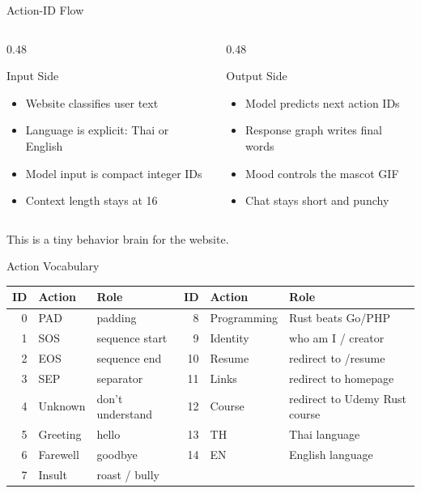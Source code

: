\documentclass[10pt,aspectratio=169]{beamer}
\begin{document}
\begin{frame}{Action-ID Flow}
  \begin{columns}[T]
    \begin{column}{0.48\textwidth}
      \begin{block}{Input Side}
        \begin{itemize}
          \item Website classifies user text
          \item Language is explicit: Thai or English
          \item Model input is compact integer IDs
          \item Context length stays at 16
        \end{itemize}
      \end{block}
    \end{column}
    \begin{column}{0.48\textwidth}
      \begin{block}{Output Side}
        \begin{itemize}
          \item Model predicts next action IDs
          \item Response graph writes final words
          \item Mood controls the mascot GIF
          \item Chat stays short and punchy
        \end{itemize}
      \end{block}
    \end{column}
  \end{columns}

  \bigskip
  \centering
  This is a tiny behavior brain for the website.
\end{frame}

\begin{frame}{Action Vocabulary}
  \small
  \centering
  \begin{tabular}{rll@{\qquad}rll}
    \toprule
    \textbf{ID} & \textbf{Action} & \textbf{Role}
      & \textbf{ID} & \textbf{Action} & \textbf{Role} \\
    \midrule
     0 & PAD & padding            &  8 & Programming & Rust beats Go/PHP \\
     1 & SOS & sequence start     &  9 & Identity & who am I / creator \\
     2 & EOS & sequence end       & 10 & Resume & redirect to /resume \\
     3 & SEP & separator          & 11 & Links & redirect to homepage \\
     4 & Unknown & don't understand & 12 & Course & redirect to Udemy Rust course \\
     5 & Greeting & hello          & 13 & TH & Thai language \\
     6 & Farewell & goodbye        & 14 & EN & English language \\
     7 & Insult & roast / bully    &    &    & \\
    \bottomrule
  \end{tabular}
\end{frame}
\end{document}

